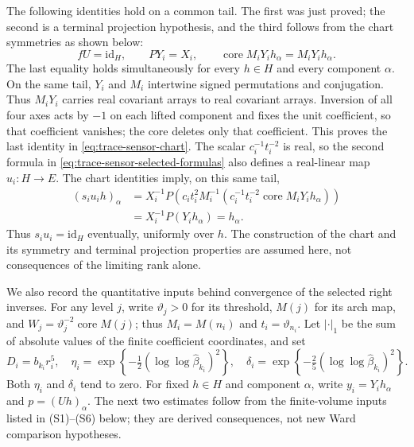 The following identities hold on a common tail. The first was just proved;
the second is a terminal projection hypothesis, and the third follows from
the chart symmetries as shown below:
\begin{equation}
 fU=\mathrm{id}_H,\qquad P Y_i=X_i,\qquad
 \operatorname{core} M_iY_i h_\alpha=M_iY_i h_\alpha.
 \label{eq:trace-sensor-chart}
\end{equation}
The last equality holds simultaneously for every $h\in H$ and every component
$\alpha$. On the same tail, $Y_i$ and $M_i$ intertwine signed permutations
and conjugation. Thus $M_iY_i$ carries real covariant arrays to real
covariant arrays. Inversion of all four axes acts by $-1$ on each lifted
component and fixes the unit coefficient, so that coefficient vanishes; the
core deletes only that coefficient. This proves the last identity in
\eqref{eq:trace-sensor-chart}. The scalar $c_i^{-1}t_i^{-2}$ is real, so the
second formula in \eqref{eq:trace-sensor-selected-formulas} also defines a
real-linear map $u_i:H\to E$. The chart identities imply, on this same tail,
\begin{align*}
 (s_i u_i h)_\alpha
 &=X_i^{-1}P\!\left(c_it_i^2M_i^{-1}
       (c_i^{-1}t_i^{-2}\operatorname{core}M_iY_i h_\alpha)\right)\\
 &=X_i^{-1}P(Y_i h_\alpha)=h_\alpha.
\end{align*}
Thus $s_i u_i=\mathrm{id}_H$ eventually, uniformly over $h$. The construction
of the chart and its symmetry and terminal projection properties are assumed
here, not consequences of the limiting rank alone.

We also record the quantitative inputs behind convergence of the selected
right inverses. For any level $j$, write $\vartheta_j>0$ for its threshold,
$M(j)$ for its arch map, and $W_j=\vartheta_j^{-2}\operatorname{core}M(j)$; thus $M_i=M(n_i)$
and $t_i=\vartheta_{n_i}$. Let $|\cdot|_1$ be the sum of absolute values of the
finite coefficient coordinates, and set
\[
 D_i=b_{k_i}r_i^5,\quad
 \eta_i=\exp\!\left\{-\tfrac12(\log\log\widehat\beta_{k_i})^2\right\},
 \quad
 \delta_i=\exp\!\left\{-\tfrac25(\log\log\widehat\beta_{k_i})^2\right\}.
\]
Both $\eta_i$ and $\delta_i$ tend to zero. For fixed $h\in H$ and
component $\alpha$, write $y_i=Y_i h_\alpha$ and $p=(Uh)_\alpha$.
The next two estimates follow from the finite-volume inputs listed in
(S1)--(S6) below; they are derived consequences, not new Ward comparison hypotheses.

